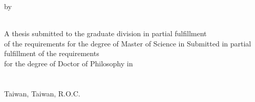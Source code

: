\begin{center}


\begin{minipage}[c][5cm][t]{\textwidth}
  \begin{center}
    \makebox[\textwidth][c]{\parbox{\paperwidth }{\center \Large \GetEngTitle}}

    \vspace{0.5cm}
    \Large by \\

    \vspace{0.5cm}
    \Large \GetAuthorEngName \\
  \end{center}
\end{minipage}


\begin{minipage}[c][5cm][t]{\textwidth}
  \begin{center}\Large %
  {%
    A thesis submitted to the graduate division in partial fulfillment\\
    of the requirements for the degree of Master of Science in%
  } %
  {%
    Submitted in partial fulfillment of the requirements\\%
    for the degree of Doctor of Philosophy in%
  } %
  \GetDeptEngName\\%
  \GetCollEngName\\%
  \GetSchoolEngName\\%
  Taiwan, Taiwan, R.O.C.\\%
  \vspace{0.1cm}
  \GetOralEngDay \thinspace \thinspace \GetThesisMonthInEng \thinspace \thinspace \GetThesisYear%
  \end{center}
\end{minipage}


\vspace{1.0cm}
\begin{minipage}[c][9.0cm][t]{\textwidth}
   \\
  \vspace{0.5cm}
  \DisplayCommitteeSignatureArea
\end{minipage}


\end{center}
